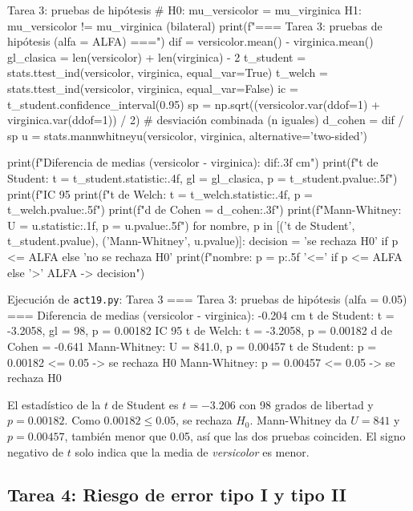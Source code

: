 \documentclass[11pt,letterpaper]{article}
\begin{document}
\begin{codigo}[label=cod:t3]{Tarea 3: pruebas de hipótesis}
# H0: mu_versicolor = mu_virginica     H1: mu_versicolor != mu_virginica (bilateral)
print(f"\n=== Tarea 3: pruebas de hipótesis (alfa = {ALFA}) ===")
dif = versicolor.mean() - virginica.mean()
gl_clasica = len(versicolor) + len(virginica) - 2
t_student = stats.ttest_ind(versicolor, virginica, equal_var=True)
t_welch = stats.ttest_ind(versicolor, virginica, equal_var=False)
ic = t_student.confidence_interval(0.95)
sp = np.sqrt((versicolor.var(ddof=1) + virginica.var(ddof=1)) / 2)  # desviación combinada (n iguales)
d_cohen = dif / sp
u = stats.mannwhitneyu(versicolor, virginica, alternative='two-sided')

print(f"Diferencia de medias (versicolor - virginica): {dif:.3f} cm")
print(f"t de Student:  t = {t_student.statistic:.4f}, gl = {gl_clasica}, p = {t_student.pvalue:.5f}")
print(f"IC 95%
print(f"t de Welch:    t = {t_welch.statistic:.4f}, p = {t_welch.pvalue:.5f}")
print(f"d de Cohen = {d_cohen:.3f}")
print(f"Mann-Whitney:  U = {u.statistic:.1f}, p = {u.pvalue:.5f}")
for nombre, p in [('t de Student', t_student.pvalue), ('Mann-Whitney', u.pvalue)]:
    decision = 'se rechaza H0' if p <= ALFA else 'no se rechaza H0'
    print(f"{nombre}: p = {p:.5f} {'<=' if p <= ALFA else '>'} {ALFA} -> {decision}")
\end{codigo}

\begin{consola}[label=out:t3]{Ejecución de \texttt{act19.py}: Tarea 3}
=== Tarea 3: pruebas de hipótesis (alfa = 0.05) ===
Diferencia de medias (versicolor - virginica): -0.204 cm
t de Student:  t = -3.2058, gl = 98, p = 0.00182
IC 95%
t de Welch:    t = -3.2058, p = 0.00182
d de Cohen = -0.641
Mann-Whitney:  U = 841.0, p = 0.00457
t de Student: p = 0.00182 <= 0.05 -> se rechaza H0
Mann-Whitney: p = 0.00457 <= 0.05 -> se rechaza H0
\end{consola}

El estadístico de la $t$ de Student es $t = -3.206$ con 98 grados de libertad y $p = 0.00182$. Como $0.00182 \le 0.05$, se rechaza $H_0$. Mann-Whitney da $U = 841$ y $p = 0.00457$, también menor que 0.05, así que las dos pruebas coinciden. El signo negativo de $t$ solo indica que la media de \textit{versicolor} es menor.

\subsection{Tarea 4: Riesgo de error tipo I y tipo II}
\end{document}
